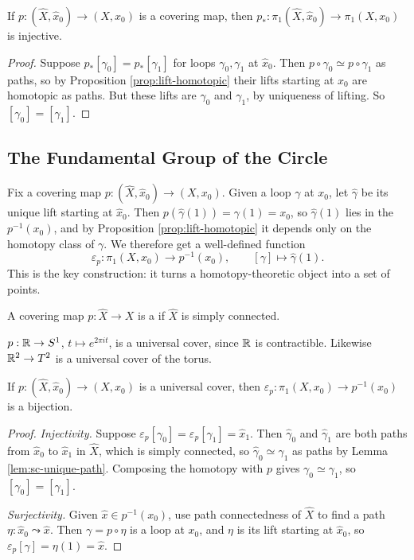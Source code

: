 \documentclass[a4paper]{scrartcl}
\begin{document}
\begin{corollary} \label{cor:p-injective}
	If $p: (\hat X, \hat x_0) \to (X, x_0)$ is a covering map, then $p_*: \pi_1(\hat{X}, \hat{x}_0) \rightarrow \pi_1(X, x_0)$ is injective.
\end{corollary}
\begin{proof}
	Suppose $p_*[\gamma_0] = p_*[\gamma_1]$ for loops $\gamma_0, \gamma_1$ at $\hat x_0$. Then $p \circ \gamma_0 \simeq p \circ \gamma_1$ as paths, so by Proposition \ref{prop:lift-homotopic} their lifts starting at $\hat x_0$ are homotopic as paths. But these lifts are $\gamma_0$ and $\gamma_1$, by uniqueness of lifting. So $[\gamma_0] = [\gamma_1]$.
\end{proof}

\subsection{The Fundamental Group of the Circle}

Fix a covering map $p: (\hat X, \hat x_0) \to (X, x_0)$. Given a loop $\gamma$ at $x_0$,
let $\hat\gamma$ be its unique lift starting at $\hat x_0$. Then
$p(\hat\gamma(1)) = \gamma(1) = x_0$, so $\hat\gamma(1)$ lies in the 
$p^{-1}(x_0)$, and by Proposition \ref{prop:lift-homotopic} it depends only on the
homotopy class of $\gamma$. We therefore get a well-defined function
$$
\varepsilon_p: \pi_1(X, x_0) \longrightarrow p^{-1}(x_0), \qquad [\gamma] \mapsto \hat\gamma(1).
$$
This is the key construction: it turns a homotopy-theoretic object into a set of points.

\begin{definition}
	A covering map $p: \hat{X} \to X$ is a  if $\hat X$ is simply connected.
\end{definition}

\begin{example}
	$p: \mathbb{R} \to S^1$, $t \mapsto e^{2\pi i t}$, is a universal cover, since $\mathbb{R}$ is contractible. Likewise $\mathbb{R}^2 \to T^2$ is a universal cover of the torus.
\end{example}

\begin{proposition} \label{prop:eps-bijection}
	If $p: (\hat X, \hat x_0) \to (X, x_0)$ is a universal cover, then $\varepsilon_p: \pi_1(X, x_0) \to p^{-1}(x_0)$ is a bijection.
\end{proposition}
\begin{proof}
	\emph{Injectivity.} Suppose $\varepsilon_p[\gamma_0] = \varepsilon_p[\gamma_1] = \hat x_1$. Then $\hat\gamma_0$ and $\hat\gamma_1$ are both paths from $\hat x_0$ to $\hat x_1$ in $\hat X$, which is simply connected, so $\hat\gamma_0 \simeq \hat\gamma_1$ as paths by Lemma \ref{lem:sc-unique-path}. Composing the homotopy with $p$ gives $\gamma_0 \simeq \gamma_1$, so $[\gamma_0] = [\gamma_1]$.

	\emph{Surjectivity.} Given $\hat x \in p^{-1}(x_0)$, use path connectedness of $\hat X$ to find a path $\eta: \hat x_0 \leadsto \hat x$. Then $\gamma = p \circ \eta$ is a loop at $x_0$, and $\eta$ is its lift starting at $\hat x_0$, so $\varepsilon_p[\gamma] = \eta(1) = \hat x$.
\end{proof}
\end{document}

